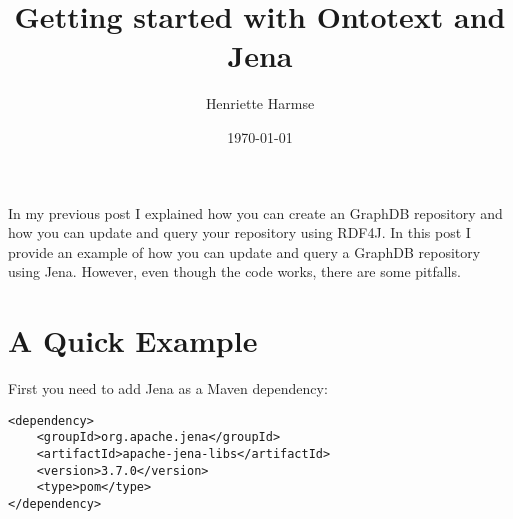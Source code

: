 \documentclass{amsart}
\title{Getting started with Ontotext and Jena}
\author{Henriette Harmse}
\date{\today}
\begin{document}
  \maketitle
  In my previous post I explained how you can create an GraphDB repository and how you can update and query your repository using RDF4J. In this post I provide an example of how you can update and query a GraphDB repository using Jena. However, even though the code works, there are some pitfalls.

 \section{A Quick Example}
 First you need to add Jena as a Maven dependency:
 
\begin{small}
\begin{verbatim} 
<dependency>
    <groupId>org.apache.jena</groupId>
    <artifactId>apache-jena-libs</artifactId>
    <version>3.7.0</version>
    <type>pom</type>
</dependency> 
\end{verbatim}
\end{small}  
  
\end{document}
